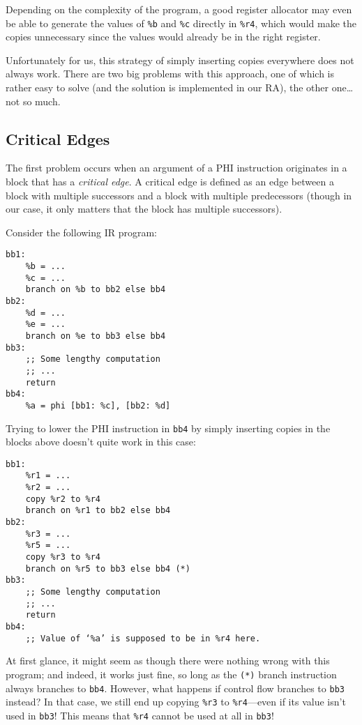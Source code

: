 \documentclass[12pt]{report}
\begin{document}
\noindent Depending on the complexity of the program, a good register allocator may even be able to generate the values of \verb|%b| and
\verb|%c| directly in \verb|%r4|, which would make the copies unnecessary since the values would already be in the right register.

Unfortunately for us, this strategy of simply inserting copies everywhere does not always work. There are two big problems with this
approach, one of which is rather easy to solve (and the solution is implemented in our RA), the other one\ldots{} not so much.

\subsection{Critical Edges}
The first problem occurs when an argument of a PHI instruction originates in a block that has a \textit{critical edge}. A critical edge is
defined as an edge between a block with multiple successors and a block with multiple predecessors (though in our case, it only matters
that the block has multiple successors). 

Consider the following IR program:
\begin{Verbatim}
bb1:
    %b = ...
    %c = ...
    branch on %b to bb2 else bb4
bb2:
    %d = ...
    %e = ...
    branch on %e to bb3 else bb4
bb3:
    ;; Some lengthy computation
    ;; ...
    return
bb4:
    %a = phi [bb1: %c], [bb2: %d]
\end{Verbatim}

\noindent Trying to lower the PHI instruction in \verb|bb4| by simply inserting copies in the blocks above doesn't quite work in this case:
\begin{Verbatim}
bb1:
    %r1 = ...
    %r2 = ...
    copy %r2 to %r4
    branch on %r1 to bb2 else bb4
bb2:
    %r3 = ...
    %r5 = ...
    copy %r3 to %r4
    branch on %r5 to bb3 else bb4 (*)
bb3:
    ;; Some lengthy computation
    ;; ...
    return
bb4:
    ;; Value of ‘%a’ is supposed to be in %r4 here.
\end{Verbatim}

\noindent At first glance, it might seem as though there were nothing wrong with this program; and indeed, it works just fine, so long
as the \verb|(*)| branch instruction always branches to \verb|bb4|. However, what happens if control flow branches to \verb|bb3| instead? 
In that case, we still end up copying \verb|%r3| to \verb|%r4|—even if its value isn't used in \verb|bb3|! This means that \verb|%r4| 
cannot be used at all in \verb|bb3|! 
\end{document}
